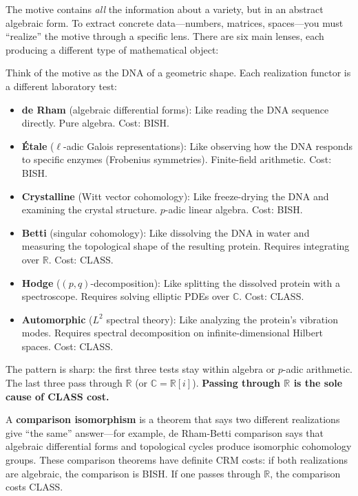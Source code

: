 \documentclass[11pt,twoside,openany]{report}
\theoremstyle{remark}
\newcommand{\BISH}{\textsf{BISH}}
\newcommand{\CLASS}{\textsf{CLASS}}
\begin{document}
The motive contains \emph{all} the information about a variety, but in an abstract algebraic form. To extract concrete data---numbers, matrices, spaces---you must ``realize'' the motive through a specific lens. There are six main lenses, each producing a different type of mathematical object:

\begin{analogybox}
Think of the motive as the DNA of a geometric shape. Each realization functor is a different laboratory test:
\begin{itemize}
  \item \textbf{de Rham} (algebraic differential forms): Like reading the DNA sequence directly. Pure algebra. Cost: \BISH.
  \item \textbf{\'Etale} ($\ell$-adic Galois representations): Like observing how the DNA responds to specific enzymes (Frobenius symmetries). Finite-field arithmetic. Cost: \BISH.
  \item \textbf{Crystalline} (Witt vector cohomology): Like freeze-drying the DNA and examining the crystal structure. $p$-adic linear algebra. Cost: \BISH.
  \item \textbf{Betti} (singular cohomology): Like dissolving the DNA in water and measuring the topological shape of the resulting protein. Requires integrating over $\mathbb{R}$. Cost: \CLASS.
  \item \textbf{Hodge} ($(p,q)$-decomposition): Like splitting the dissolved protein with a spectroscope. Requires solving elliptic PDEs over $\mathbb{C}$. Cost: \CLASS.
  \item \textbf{Automorphic} ($L^2$ spectral theory): Like analyzing the protein's vibration modes. Requires spectral decomposition on infinite-dimensional Hilbert spaces. Cost: \CLASS.
\end{itemize}
The pattern is sharp: the first three tests stay within algebra or $p$-adic arithmetic. The last three pass through $\mathbb{R}$ (or $\mathbb{C} = \mathbb{R}[i]$). \textbf{Passing through $\mathbb{R}$ is the sole cause of \CLASS{} cost.}
\end{analogybox}

A \textbf{comparison isomorphism} is a theorem that says two different realizations give ``the same'' answer---for example, de Rham-Betti comparison says that algebraic differential forms and topological cycles produce isomorphic cohomology groups. These comparison theorems have definite CRM costs: if both realizations are algebraic, the comparison is \BISH. If one passes through $\mathbb{R}$, the comparison costs \CLASS.
\end{document}
